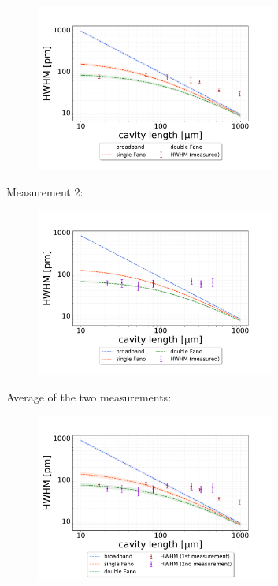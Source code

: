 \begin{figure}[h!]
    \centering
    \includegraphics[width=0.7\textwidth]{figures/results/double fano fits/HWHM_vs_cavity_length_result_1st_measurement_only.pdf}
    \caption{}
    \label{fig:HWHM_vs_l_double_fano_result_1st}
\end{figure}

Measurement 2: 

\begin{figure}[h!]
    \centering
    \includegraphics[width=0.7\textwidth]{figures/results/double fano fits/HWHM_vs_cavity_length_result_2nd_measurement_only.pdf}
    \caption{}
    \label{fig:HWHM_vs_l_double_fano_result_2nd}
\end{figure}

Average of the two measurements: 
\begin{figure}[h!]
    \centering
    \includegraphics[width=0.7\textwidth]{figures/results/double fano fits/HWHM_vs_cavity_length_result.pdf}
    \caption{}
    \label{fig:HWHM_vs_l_double_fano_result}
\end{figure}

